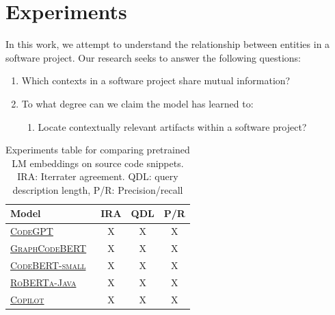 \documentclass[sigconf]{acmart}
\begin{document}
  \pagebreak
  \section{Experiments}\label{sec:experiments}

  In this work, we attempt to understand the relationship between entities in a software project. Our research seeks to answer the following questions:

  \begin{enumerate}
    \item Which contexts in a software project share mutual information?
    \item To what degree can we claim the model has learned to:\begin{enumerate}
                                                                 \item Locate contextually relevant artifacts within a software project?
    \end{enumerate}
  \end{enumerate}

  {
    \renewcommand{\arraystretch}{1.5}
    \begin{table}[H]
      \small
      \begin{tabular}{l|ccc}
        Model & IRA & QDL & P/R \\
        \hline
        \href{https://huggingface.co/microsoft/CodeGPT-small-java}{\textsc{CodeGPT}}~\citep{lu2021codexglue} & X & X & X \\
        \href{https://huggingface.co/microsoft/graphcodebert-base}{\textsc{GraphCodeBERT}}~\citep{guo2021graphcodebert} & X & X & X \\
        \href{https://huggingface.co/huggingface/CodeBERTa-small-v1a}{\textsc{CodeBERT-small}}~\citep{feng2020codebert} & X & X & X \\
        \href{https://huggingface.co/dbernsohn/roberta-java}{\textsc{RoBERTa-Java}}~\citep{liu2019roberta} & X & X & X \\
        \href{https://copilot.github.com/}{\textsc{Copilot}}\citep{chen2021evaluating} & X & X & X \\

      \end{tabular}
      \caption{\label{tab:ad_comparison} Experiments table for comparing pretrained LM embeddings on source code snippets. IRA: Iterrater agreement. QDL: query description length, P/R: Precision/recall}
    \end{table}
  }
\end{document}
